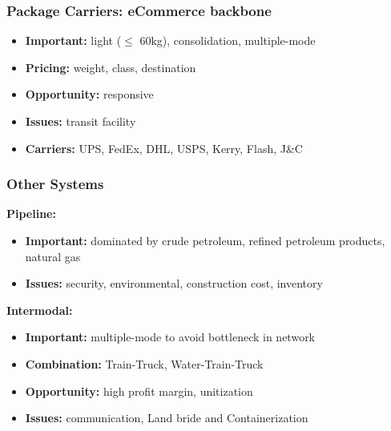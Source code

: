 \documentclass[10pt,presentation]{beamer}
\begin{document}
\begin{frame}
  \frametitle{Package Carriers: eCommerce backbone}

  \begin{itemize}
    \item \textbf{Important:} light ($\leq$ 60kg), \alert{consolidation}, multiple-mode
    \item \textbf{Pricing:} weight, class, destination
    \item \textbf{Opportunity:} \alert{responsive}
    \item \textbf{Issues:} \alert{transit facility}
    \item \textbf{Carriers:} UPS, FedEx, DHL, USPS, Kerry, Flash, J\&C
  \end{itemize}

  \end{frame}

\begin{frame}
  \frametitle{Other Systems}

  \textbf{Pipeline:}
  \begin{itemize}
    \item \textbf{Important:} dominated by crude petroleum, refined petroleum products, natural gas
    \item \textbf{Issues:} \alert{security}, environmental, construction cost, inventory
  \end{itemize}

  \NextHalfLine
  \textbf{Intermodal:}
  \begin{itemize}
    \item \textbf{Important:} multiple-mode to avoid bottleneck in network
    \item \textbf{Combination:} Train-Truck, Water-Train-Truck
    \item \textbf{Opportunity:} high profit margin, unitization
    \item \textbf{Issues:} \alert{communication}, Land bride and Containerization
   \end{itemize}


  \end{frame}
\end{document}
